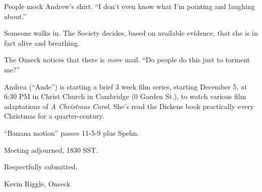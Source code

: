 \documentclass[10pt]{article}
\newcommand{\ps}{ plus Spehn\xspace}
\begin{document}
People mock Andrew's shirt.  ``I don't even know what I'm pointing and laughing about.''

Someone walks in.  The Society decides, based on available evidence, that she is in fact alive 
and breathing.

The Onseck notices that there is \emph{more} mail.  ``Do people do this just to torment me?''

Andrea (``Ande'') is starting a brief 3 week film series, starting December 5, at 6:30 PM in 
Christ Church in Cambridge (0 Garden St.), to watch various film adaptations of \emph{A Christmas
Carol}.   She's read the Dickens book practically every Christmas for a quarter-century.

``Banana motion'' passes 11-5-9\ps.

\vspace{12pt}

\noindent
Meeting adjourned, 1830 SST.

\vspace{18pt}

\centerline{Respectfully submitted,}
\centerline{Kevin Riggle, Onseck}
\end{document}

